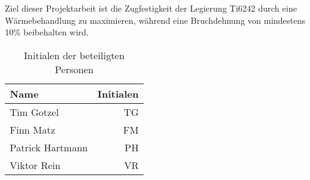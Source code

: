 Ziel dieser Projektarbeit ist die Zugfestigkeit der Legierung Ti6242 durch eine Wärmebehandlung zu maximieren, während eine Bruchdehnung von mindestens 10\% beibehalten wird.  

\begin{table}[h] 
	\centering 
	\begin{tabular}{lr} 
		
		Name & \hspace{0.5cm} Initialen\\ 
		\hline 
		Tim Gotzel & TG\\ 
		Finn Matz & FM\\ 
		Patrick Hartmann & PH \\ 
		Viktor Rein & VR\\ 
		\hline 
		
	\end{tabular} 
	\caption{Initialen der beteiligten Personen} 
	\label{tab:initialien} 
\end{table} 
